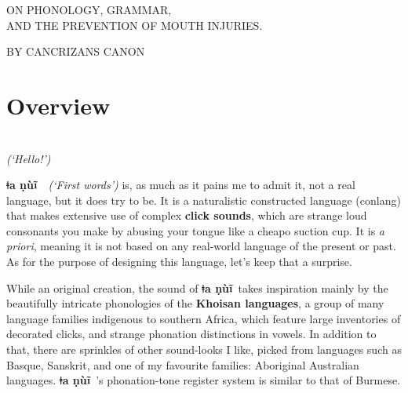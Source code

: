 \documentclass[11pt]{book}
\newcommand{\qcn}[1]{\textbf{#1}}
\newcommand{\langname}{\qcn{ǂa ṇùĩ}~}
\begin{document}
\pagestyle{empty}




\begin{center}

	\Huge

	\vspace{0.2in}


	\vspace{1in}

	{\Large ON PHONOLOGY, GRAMMAR,\\AND THE PREVENTION OF MOUTH INJURIES.}

	\vfill

	{BY CANCRIZANS CANON}

\end{center}


\pagebreak


\section{Overview}

\begin{center}
	\resizebox{1.5\width}{!}{\qcn{ǃuũǃoi!}}\\
\vspace{1em}
\emph{(`Hello!')}
\end{center}

\vspace{2em}

\langname~\emph{(`First words')} is, as much as it pains me to admit it, not a real language, but it does try to be. It is a naturalistic constructed language (conlang) that makes extensive use of complex \textbf{click sounds}, which are strange loud consonants you make by abusing your tongue like a cheapo suction cup. It is \emph{a priori}, meaning it is not based on any real-world language of the present or past. As for the purpose of designing this language, let's keep that a surprise.

While an original creation, the sound of \langname takes inspiration mainly by the beautifully intricate phonologies of the \textbf{Khoisan languages}, a group of many language families indigenous to southern Africa, which feature large inventories of decorated clicks, and strange phonation distinctions in vowels. In addition to that, there are sprinkles of other sound-looks I like, picked from languages such as Basque, Sanskrit, and one of my favourite families: Aboriginal Australian languages. \langname's phonation-tone register system is similar to that of Burmese.
\end{document}
